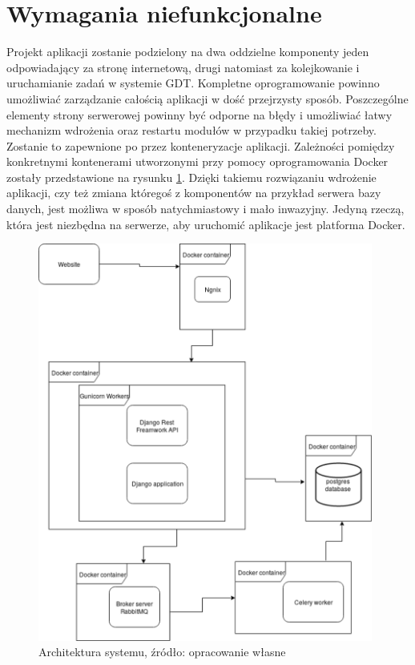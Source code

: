 \section{Wymagania niefunkcjonalne}
Projekt aplikacji zostanie podzielony na dwa oddzielne komponenty jeden odpowiadający za stronę internetową, drugi natomiast za kolejkowanie i uruchamianie zadań w systemie GDT. Kompletne oprogramowanie powinno umożliwiać zarządzanie całością aplikacji w dość przejrzysty sposób. Poszczególne elementy strony serwerowej powinny być odporne na błędy i umożliwiać łatwy mechanizm wdrożenia oraz restartu modułów w przypadku takiej potrzeby. Zostanie to zapewnione po przez konteneryzacje aplikacji. Zależności pomiędzy konkretnymi kontenerami utworzonymi przy pomocy oprogramowania Docker zostały przedstawione na rysunku \ref{rys3_architektura_systemu}. Dzięki takiemu rozwiązaniu wdrożenie aplikacji, czy też zmiana któregoś z komponentów na przykład serwera bazy danych, jest możliwa w sposób natychmiastowy i mało inwazyjny. Jedyną rzeczą, która jest niezbędna na serwerze, aby uruchomić aplikacje jest platforma Docker.    

\begin{figure}[htb]
	\centering
	\includegraphics[width=11cm]{grafika/architektura_systemu.eps}
	\caption{Architektura systemu, źródło: opracowanie własne}
	\label{rys3_architektura_systemu}
\end{figure}


